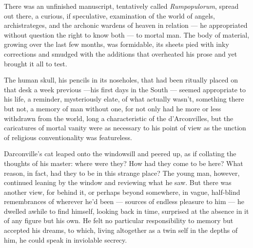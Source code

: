   There was an unfinished manuscript, tentatively called \textit{Rumpopulorum}, 
spread out there, a curious, if speculative, examination of the world of angels,
archistrateges, 
and the archonic 
wardens 
of heaven in relation --- he appropriated
without question the right to know both --- to mortal man. The body of material,
growing over the last few months, was formidable, its sheets pied 
with inky corrections and smudged 
with the additions that overheated his prose and yet brought it all to test.

  The human skull, his pencils in its noseholes, that had been ritually placed
on that desk a week previous ---his first days in the South --- seemed appropriate to
his life, a reminder, mysteriously elate, 
of what actually wasn't, something
there but not, a memory of man without one, for not only had he more or less
withdrawn from the world, long a characteristic of the d'Arconvilles, but the
caricatures of mortal vanity 
were as necessary to his point of view as the unction 
of religious conventionality was featureless.

  Darconville's cat leaped onto the windowsill and peered up, as if collating
the thoughts of his master: where were they? How had they come to be here? What
reason, in fact, had they to be in this strange place? The young man, however,
continued leaning by the window and reviewing what he saw. But there was another
view, for behind it, or perhaps beyond somewhere, in vague, half-blind
remembrances of wherever he'd been --- sources of endless pleasure to him 
--- he dwelled awhile to find himself, looking back in time, surprised at the 
absence in it of
any figure but his own. He felt no particular responsibility to memory but
accepted his dreams, to which, living altogether as a twin self in the depths of
him, he could speak in inviolable secrecy.


